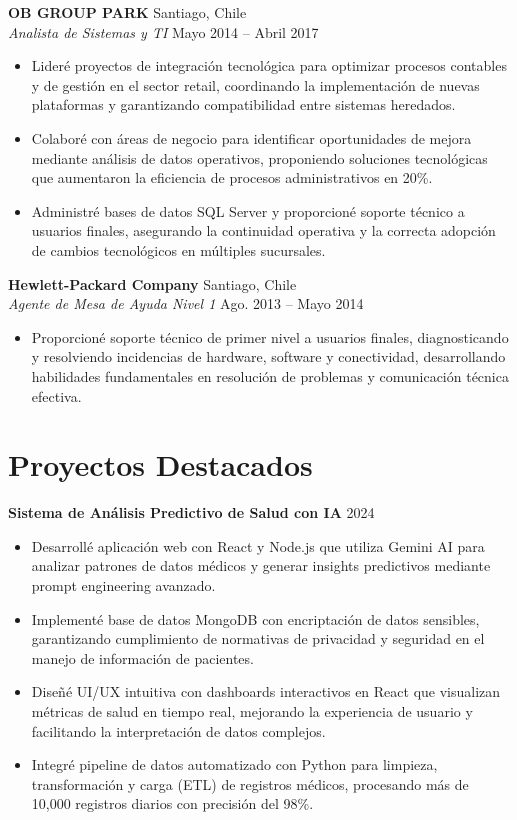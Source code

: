 \documentclass[11pt,letterpaper]{article}
\begin{document}
\vspace{2pt}
\textbf{OB GROUP PARK} \hfill Santiago, Chile\\
\textit{Analista de Sistemas y TI} \hfill Mayo 2014 – Abril 2017
\begin{itemize}
  \item Lideré proyectos de integración tecnológica para optimizar procesos contables y de gestión en el sector retail, coordinando la implementación de nuevas plataformas y garantizando compatibilidad entre sistemas heredados.
  \item Colaboré con áreas de negocio para identificar oportunidades de mejora mediante análisis de datos operativos, proponiendo soluciones tecnológicas que aumentaron la eficiencia de procesos administrativos en 20\%.
  \item Administré bases de datos SQL Server y proporcioné soporte técnico a usuarios finales, asegurando la continuidad operativa y la correcta adopción de cambios tecnológicos en múltiples sucursales.
\end{itemize}
\vspace{2pt}
\textbf{Hewlett-Packard Company} \hfill Santiago, Chile\\
\textit{Agente de Mesa de Ayuda Nivel 1} \hfill Ago. 2013 – Mayo 2014
\begin{itemize}
  \item Proporcioné soporte técnico de primer nivel a usuarios finales, diagnosticando y resolviendo incidencias de hardware, software y conectividad, desarrollando habilidades fundamentales en resolución de problemas y comunicación técnica efectiva.
\end{itemize}

\section{Proyectos Destacados}

\textbf{Sistema de Análisis Predictivo de Salud con IA} \hfill 2024
\begin{itemize}
  \item Desarrollé aplicación web con React y Node.js que utiliza Gemini AI para analizar patrones de datos médicos y generar insights predictivos mediante prompt engineering avanzado.
  \item Implementé base de datos MongoDB con encriptación de datos sensibles, garantizando cumplimiento de normativas de privacidad y seguridad en el manejo de información de pacientes.
  \item Diseñé UI/UX intuitiva con dashboards interactivos en React que visualizan métricas de salud en tiempo real, mejorando la experiencia de usuario y facilitando la interpretación de datos complejos.
  \item Integré pipeline de datos automatizado con Python para limpieza, transformación y carga (ETL) de registros médicos, procesando más de 10,000 registros diarios con precisión del 98\%.
\end{itemize}
\end{document}
